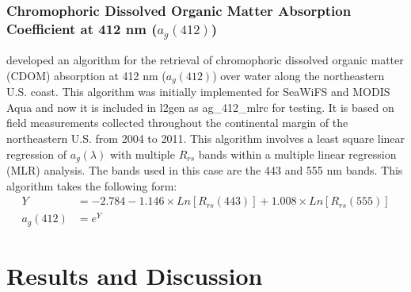 \documentclass[onecolumn,3p,letterpaper,11pt]{elsarticle}
\begin{document}
\subsubsection{Chromophoric Dissolved Organic Matter Absorption Coefficient at 412 nm ($a_g(412)$)}
\citet{Mannino2014} developed an algorithm for the retrieval of chromophoric dissolved organic matter (CDOM) absorption at 412 nm ($a_g(412)$) over water along the northeastern U.S. coast. This algorithm was initially implemented for SeaWiFS and MODIS Aqua and now it is included in l2gen as {\ttfamily ag\_412\_mlrc} for testing. It is based on field measurements collected throughout the continental margin of the northeastern U.S. from 2004 to 2011. This algorithm involves a least square linear regression of $a_g(\lambda)$ with multiple $R_{rs}$ bands within a multiple linear regression (MLR) analysis. The bands used in this case are the 443 and 555 nm bands. This algorithm takes the following form:
\begin{equation}
\begin{split}
  Y &= -2.784 -1.146\times Ln[R_{rs}(443)] + 1.008\times Ln[R_{rs}(555)] \\
  a_g(412) &= e^Y
\end{split}
\end{equation}

\section{Results and Discussion}
\label{sec:Results}
\end{document}

